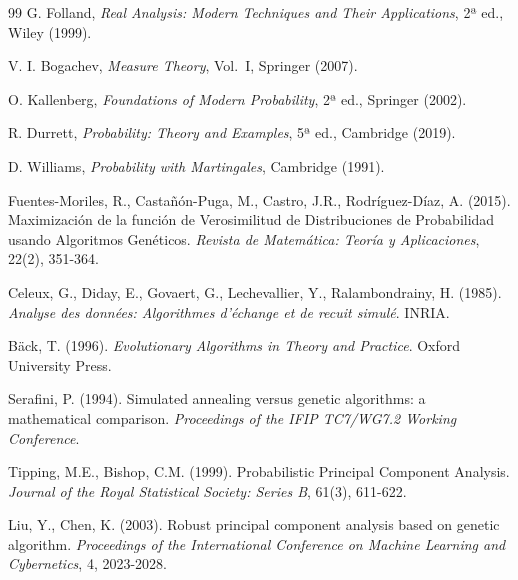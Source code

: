 \documentclass[11pt,a4paper]{article}
\theoremstyle{plain}
\theoremstyle{definition}
\theoremstyle{remark}
\newcommand{\1}{\mathbf{1}}
\begin{document}
\begin{thebibliography}{99}
G. Folland, \emph{Real Analysis: Modern Techniques and Their Applications}, 2ª ed., Wiley (1999).

V. I. Bogachev, \emph{Measure Theory}, Vol.\ I, Springer (2007).

O. Kallenberg, \emph{Foundations of Modern Probability}, 2ª ed., Springer (2002).

R. Durrett, \emph{Probability: Theory and Examples}, 5ª ed., Cambridge (2019).

D. Williams, \emph{Probability with Martingales}, Cambridge (1991).

Fuentes-Moriles, R., Castañón-Puga, M., Castro, J.R., Rodríguez-Díaz, A. (2015). Maximización de la función de Verosimilitud de Distribuciones de Probabilidad usando Algoritmos Genéticos. \textit{Revista de Matemática: Teoría y Aplicaciones}, 22(2), 351-364.

Celeux, G., Diday, E., Govaert, G., Lechevallier, Y., Ralambondrainy, H. (1985). \textit{Analyse des données: Algorithmes d'échange et de recuit simulé}. INRIA.

Bäck, T. (1996). \textit{Evolutionary Algorithms in Theory and Practice}. Oxford University Press.

Serafini, P. (1994). Simulated annealing versus genetic algorithms: a mathematical comparison. \textit{Proceedings of the IFIP TC7/WG7.2 Working Conference}.

Tipping, M.E., Bishop, C.M. (1999). Probabilistic Principal Component Analysis. \textit{Journal of the Royal Statistical Society: Series B}, 61(3), 611-622.

Liu, Y., Chen, K. (2003). Robust principal component analysis based on genetic algorithm. \textit{Proceedings of the International Conference on Machine Learning and Cybernetics}, 4, 2023-2028.
\end{thebibliography}
\end{document}
